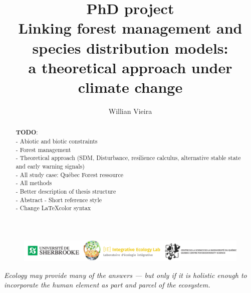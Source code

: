 


\title{
  PhD project \\
  \bigskip
  Linking forest management and species distribution models: \\
  a theoretical approach under climate change
}

\author[1,*]{Willian Vieira}
\date{}



\maketitle

\begin{abstract}

\textbf{TODO}: \\
- Abiotic and biotic constraints \\
- Forest management \\
- Theoretical approach (SDM, Disturbance, resilience calculus, alternative stable state and early warning signals) \\
- All study case: Québec Forest ressource \\
- All methods \\
- Better description of thesis structure \\
- Abstract
- Short reference style \\
- Change \LaTeX color syntax

\end{abstract}

\vfill
\begin{figure}
\centering\includegraphics[width=16cm]{img/logo.pdf}
\end{figure}
\thispagestyle{empty} %
\clearpage

\thispagestyle{empty}
\tableofcontents
\clearpage


\begin{displayquote}
\centering\textit{Ecology may provide many of the answers — but only if it is holistic enough to incorporate the human element as part and parcel of the ecosystem.} \\ 
\end{displayquote}

